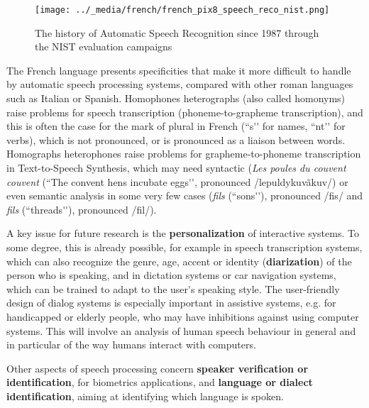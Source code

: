 \begin{multicols}{2}
\begin{figure}[!ht]
\begin{center}
  \texttt{[image: ../\_media/french/french\_pix8\_speech\_reco\_nist.png]}
  \caption{The history of Automatic Speech Recognition since 1987 through the NIST evaluation campaigns~\cite{speechreconist}}
  \label{fig:nistreco}
\end{center}
\end{figure}

The French language presents specificities that make it more difficult
to handle by automatic speech processing systems, compared with other
roman languages such as Italian or Spanish. Homophones heterographs
(also called homonyms) raise problems for speech transcription
(phoneme-to-grapheme transcription), and this is often the case for
the mark of plural in French (``s{\mbox '}{\mbox '} for names, ``nt{\mbox '}{\mbox '} for verbs), which is
not pronounced, or is pronounced as a liaison between
words. Homographs heterophones raise problems for grapheme-to-phoneme
transcription in Text-to-Speech Synthesis, which may need syntactic
({\em Les poules du couvent couvent} (``The convent hens incubate eggs{\mbox '}{\mbox '},
pronounced /lepuldykuvãkuv/) or even semantic analysis in some very
few cases ({\em fils} (``sons{\mbox '}{\mbox '}), pronounced /fis/ and {\em fils} (``threads{\mbox '}{\mbox '}),
pronounced /fil/).

A key issue for future research is the {\bf personalization} of interactive
systems. To some degree, this is already possible, for example in
speech transcription systems, which can also recognize the genre, age,
accent or identity ({\bf diarization}) of the person who is speaking, and in
dictation systems or car navigation systems, which can be trained to
adapt to the user{\mbox '}s speaking style. The user-friendly design of dialog
systems is especially important in assistive systems, e.g. for
handicapped or elderly people, who may have inhibitions against using
computer systems. This will involve an analysis of human speech
behaviour in general and in particular of the way humans interact with
computers.

Other aspects of speech processing concern {\bf speaker verification or
identification}, for biometrics applications, and {\bf language or dialect
identification}, aiming at identifying which language is spoken.


\end{multicols}
